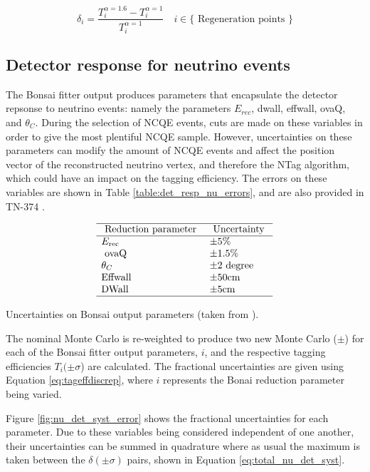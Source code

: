 \begin{equation}
    \delta_i=\frac{T_i^{\alpha=1.6}-T_i^{\alpha=1}}{T_i^{\alpha=1}} \quad i \in\{\text { Regeneration points }\}
\label{eq:PMT_gain_drift_uncertainty}
\end{equation}


\subsection{Detector response for neutrino events}
 
The Bonsai fitter output produces parameters that encapsulate the detector repsonse to neutrino events: namely the parameters $E_{rec}$, dwall, effwall, ovaQ, and $\theta_C$. During the selection of NCQE events, cuts are made on these variables in order to give the most plentiful NCQE sample. However, uncertainties on these parameters can modify the amount of NCQE events and affect the position vector of the reconstructed neutrino vertex, and therefore the NTag algorithm, which could have an impact on the tagging efficiency. The errors on these variables are shown in Table \ref{table:det_resp_nu_errors}, and are also provided in TN-374 \cite{tn_374}.

\begin{table}
    $$
\begin{array}{ll}
\hline \text { Reduction parameter }  & \text { Uncertainty } \\
\hline E_{\text {rec }}  & \pm 5 \% \\
\text { ovaQ } & \pm 1.5 \% \\
\theta_C & \pm 2 \text { degree } \\
\text{Effwall} & \pm 50 \text {cm} \\
\text{DWall} & \pm 5 \text{cm}  \\
\hline
\end{array}
$$
\caption{Uncertainties on Bonsai output parameters (taken from \cite{tn_374}).}
\label{table:det_resp_nu_errors}
\end{table}

The nominal Monte Carlo is re-weighted to produce two new Monte Carlo ($\pm$) for each of the Bonsai fitter output parameters, $i$, and the respective tagging efficiencies $T_{i}(\pm\sigma$) are calculated. The fractional uncertainties are given using Equation \ref{eq:tageffdiscrep}, where $i$ represents the Bonai reduction parameter being varied.



Figure \ref{fig:nu_det_syst_error} shows the fractional uncertainties for each parameter. Due to these variables being considered independent of one another, their uncertainties can be summed in quadrature where as usual the maximum is taken between the $\delta(\pm\sigma)$ pairs, shown in Equation \ref{eq:total_nu_det_syst}.

